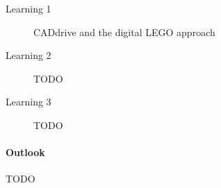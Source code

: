 \documentclass{PDS}
\begin{document}
\begin{description}
    \item[Learning 1] CADdrive and the digital LEGO approach
    \item[Learning 2] TODO
    \item[Learning 3] TODO
\end{description}

\paragraph{Outlook}

TODO

\begin{Backmatter}




\end{Backmatter}
\end{document}
